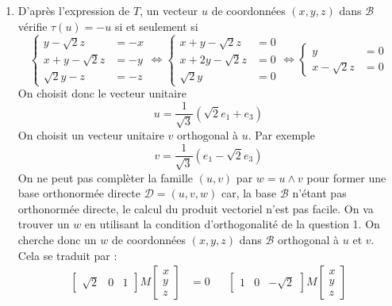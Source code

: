 \begin{enumerate}
\begin{enumerate}
\item D'après l'expression de $T$, un vecteur $u$ de coordonnées $(x,y,z)$ dans $\mathcal B$ vérifie $\tau(u)=-u$ si et seulement si
\begin{displaymath}
 \left\lbrace 
\begin{aligned}
 y  -\sqrt{2}z &= -x\\
 x+y -\sqrt{2}z &=-y \\
 \sqrt{2} y - z &=-z
\end{aligned}
\right. \Leftrightarrow
\left\lbrace 
\begin{aligned}
x+y-\sqrt{2}z &=0 \\
x+ 2y -\sqrt{2}z &= 0 \\
\sqrt{2}y &=0
\end{aligned}
\right. 
\Leftrightarrow
\left\lbrace 
\begin{aligned}
y &=0 \\
x-\sqrt{2}z &=0
\end{aligned}
\right. 
\end{displaymath}
On choisit donc le vecteur unitaire
\begin{displaymath}
 u = \dfrac{1}{\sqrt{3}}\left( \sqrt{2}e_1 + e_3\right) 
\end{displaymath}
On choisit un vecteur unitaire $v$ orthogonal à $u$. Par exemple
\begin{displaymath}
 v = \dfrac{1}{\sqrt{3}}\left( e_1 - \sqrt{2} e_3\right) 
\end{displaymath}
On ne peut pas complèter la famille $(u,v)$ par $w=u\wedge v$ pour former une base orthonormée directe $\mathcal D =(u,v,w)$ car, la base $\mathcal B$ n'étant pas orthonormée directe, le calcul du produit vectoriel n'est pas facile. On va trouver un $w$ en utilisant la condition d'orthogonalité de la question 1.\newline
On cherche donc un $w$ de coordonnées $(x,y,z)$ dans $\mathcal B$ orthogonal à $u$ et $v$.  Cela se traduit par :
\begin{align*}
 \begin{bmatrix}
  \sqrt{2} & 0 & 1
 \end{bmatrix}
M
\begin{bmatrix}
 x \\ y \\ z
\end{bmatrix}
 &= 0 
 & &
 \begin{bmatrix}
  1 & 0 & -\sqrt{2}
 \end{bmatrix}
M
\begin{bmatrix}
 x \\ y \\ z

\end{bmatrix}
\end{align*}
\end{enumerate}
\end{enumerate}

